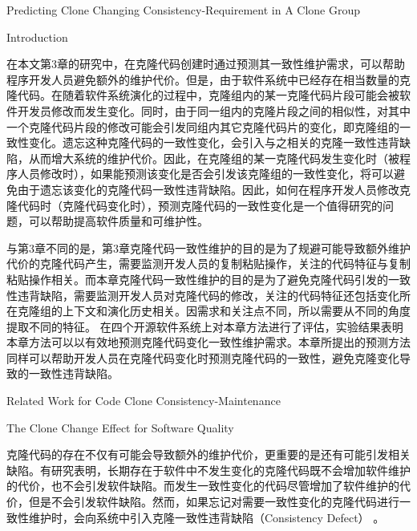 
{Predicting Clone Changing Consistency-Requirement in A Clone Group}

{Introduction}

在本文第3章的研究中，在克隆代码创建时通过预测其一致性维护需求，可以帮助程序开发人员避免额外的维护代价。但是，由于软件系统中已经存在相当数量的克隆代码。在随着软件系统演化的过程中，克隆组内的某一克隆代码片段可能会被软件开发员修改而发生变化。同时，由于同一组内的克隆片段之间的相似性，对其中一个克隆代码片段的修改可能会引发同组内其它克隆代码片的变化，即克隆组的一致性变化。遗忘这种克隆代码的一致性变化，会引入与之相关的克隆一致性违背缺陷，从而增大系统的维护代价。因此，在克隆组的某一克隆代码发生变化时（被程序人员修改时），如果能预测该变化是否会引发该克隆组的一致性变化，将可以避免由于遗忘该变化的克隆代码一致性违背缺陷。因此，如何在程序开发人员修改克隆代码时（克隆代码变化时），预测克隆代码的一致性变化是一个值得研究的问题，可以帮助提高软件质量和可维护性。

与第3章不同的是，第3章克隆代码一致性维护的目的是为了规避可能导致额外维护代价的克隆代码产生，需要监测开发人员的复制粘贴操作，关注的代码特征与复制粘贴操作相关。而本章克隆代码一致性维护的目的是为了避免克隆代码引发的一致性违背缺陷，需要监测开发人员对克隆代码的修改，关注的代码特征还包括变化所在克隆组的上下文和演化历史相关。因需求和关注点不同，所以需要从不同的角度提取不同的特征。
在四个开源软件系统上对本章方法进行了评估，实验结果表明本章方法可以以有效地预测克隆代码变化一致性维护需求。本章所提出的预测方法同样可以帮助开发人员在克隆代码变化时预测克隆代码的一致性，避免克隆变化导致的一致性违背缺陷。

{Related Work for Code Clone Consistency-Maintenance}

{The Clone Change Effect for Software Quality}

克隆代码的存在不仅有可能会导致额外的维护代价，更重要的是还有可能引发相关缺陷。有研究表明，长期存在于软件中不发生变化的克隆代码既不会增加软件维护的代价，也不会引发软件缺陷。而发生一致性变化的代码尽管增加了软件维护的代价，但是不会引发软件缺陷。然而，如果忘记对需要一致性变化的克隆代码进行一致性维护时，会向系统中引入克隆一致性违背缺陷（Consistency Defect）\cite{bettenburg2009empirical} \cite {juergens2009code}。

